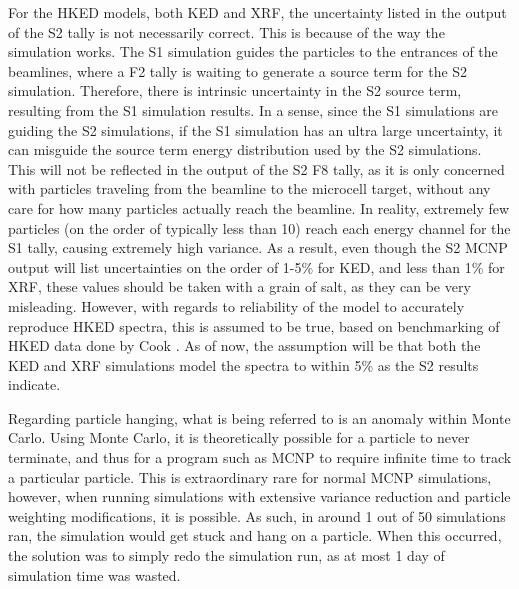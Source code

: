 For the HKED models, both KED and XRF, the uncertainty listed in the output of the S2 tally is not necessarily correct. This is because of the way the simulation works. The S1 simulation guides the particles to the entrances of the beamlines, where a F2 tally is waiting to generate a source term for the S2 simulation. Therefore, there is intrinsic uncertainty in the S2 source term, resulting from the S1 simulation results. In a sense, since the S1 simulations are guiding the S2 simulations, if the S1 simulation has an ultra large uncertainty, it can misguide the source term energy distribution used by the S2 simulations. This will not be reflected in the output of the S2 F8 tally, as it is only concerned with particles traveling from the beamline to the microcell target, without any care for how many particles actually reach the beamline. In reality, extremely few particles (on the order of typically less than 10) reach each energy channel for the S1 tally, causing extremely high variance. As a result, even though the S2 MCNP output will list uncertainties on the order of 1-5\% for KED, and less than 1\% for XRF, these values should be taken with a grain of salt, as they can be very misleading. However, with regards to reliability of the model to accurately reproduce HKED spectra, this is assumed to be true, based on benchmarking of HKED data done by Cook \cite{Cook2015}. As of now, the assumption will be that both the KED and XRF simulations model the spectra to within 5\% as the S2 results indicate. 

Regarding particle hanging, what is being referred to is an anomaly within Monte Carlo. Using Monte Carlo, it is theoretically possible for a particle to never terminate, and thus for a program such as MCNP to require infinite time to track a particular particle. This is extraordinary rare for normal MCNP simulations, however, when running simulations with extensive variance reduction and particle weighting modifications, it is possible. As such, in around 1 out of 50 simulations ran, the simulation would get stuck and hang on a particle. When this occurred, the solution was to simply redo the simulation run, as at most 1 day of simulation time was wasted. 




